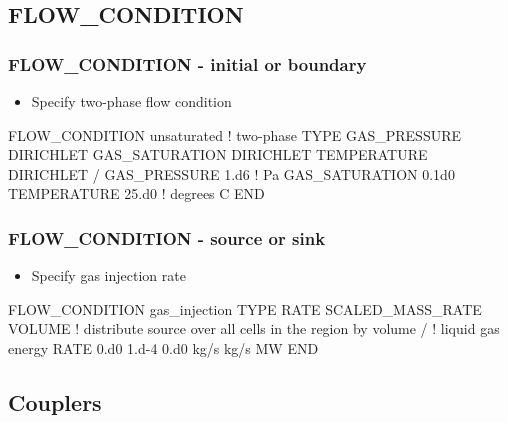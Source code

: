 \documentclass{beamer}
\newcommand\bluecomment[1]{{{\color{blue} #1}}}
\begin{document}
\subsection{FLOW\_CONDITION}

\begin{frame}[fragile]\frametitle{FLOW\_CONDITION - initial or boundary}
\begin{itemize}
  \item{Specify two-phase flow condition}
\end{itemize}

\begin{semiverbatim}

FLOW_CONDITION unsaturated \bluecomment{! two-phase}
  TYPE
    GAS_PRESSURE DIRICHLET
    GAS_SATURATION DIRICHLET
    TEMPERATURE DIRICHLET
  /
  GAS_PRESSURE 1.d6 \bluecomment{! Pa}
  GAS_SATURATION 0.1d0
  TEMPERATURE 25.d0 \bluecomment{! degrees C}
END
\end{semiverbatim}

\end{frame}

\begin{frame}[fragile]\frametitle{FLOW\_CONDITION - source or sink}
\begin{itemize}
  \item{Specify gas injection rate}
\end{itemize}

\begin{semiverbatim}

FLOW_CONDITION gas_injection
  TYPE
    RATE SCALED_MASS_RATE VOLUME \bluecomment{! distribute source over all cells in the region by volume}
  /
       \bluecomment{! liquid gas energy}
  RATE 0.d0 1.d-4 0.d0 kg/s kg/s MW
END
\end{semiverbatim}

\end{frame}

\subsection{Couplers}
\end{document}
